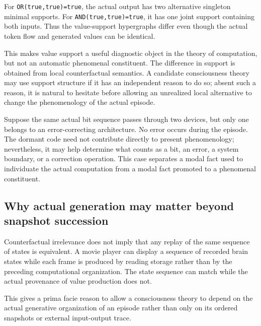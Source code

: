 \documentclass[11pt,a4paper]{article}
\begin{document}
\begin{stressbox}[title={OR versus AND: why value support is not automatically phenomenal}]
For \texttt{OR(true,true)=true}, the actual output has two alternative singleton minimal supports. For \texttt{AND(true,true)=true}, it has one joint support containing both inputs. Thus the value-support hypergraphs differ even though the actual token flow and generated values can be identical.

This makes value support a useful diagnostic object in the theory of computation, but not an automatic phenomenal constituent. The difference in support is obtained from local counterfactual semantics. A candidate consciousness theory may use support structure if it has an independent reason to do so; absent such a reason, it is natural to hesitate before allowing an unrealized local alternative to change the phenomenology of the actual episode.
\end{stressbox}

\begin{stressbox}[title={Dormant error correction: individuation versus constitution}]
Suppose the same actual bit sequence passes through two devices, but only one belongs to an error-correcting architecture. No error occurs during the episode. The dormant code need not contribute directly to present phenomenology; nevertheless, it may help determine what counts as a bit, an error, a system boundary, or a correction operation. This case separates a modal fact used to individuate the actual computation from a modal fact promoted to a phenomenal constituent.
\end{stressbox}

\subsection{Why actual generation may matter beyond snapshot succession}

Counterfactual irrelevance does not imply that any replay of the same sequence of states is equivalent. A movie player can display a sequence of recorded brain states while each frame is produced by reading storage rather than by the preceding computational organization. The state sequence can match while the actual provenance of value production does not.

This gives a prima facie reason to allow a consciousness theory to depend on the actual generative organization of an episode rather than only on its ordered snapshots or external input-output trace.
\end{document}
